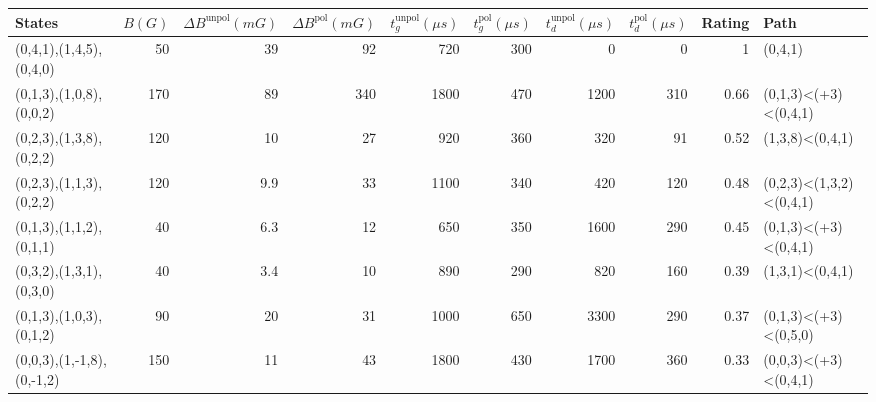 \begin{tabular}{lrrrrrrrrl}
\hline
 {States}                  &   {$B(G)$} &   {$\Delta B^{\text{unpol}}(mG)$} &   {$\Delta B^{\text{pol}}(mG)$} &   {$t^{\text{unpol}}_{g}(\mu s)$} &   {$t^{\text{pol}}_{g}(\mu s)$} &   {$t^{\text{unpol}}_{d}(\mu s)$} &   {$t^{\text{pol}}_{d}(\mu s)$} &   {Rating} & {Path}                  \\
\hline
 (0,4,1),(1,4,5),(0,4,0)   &         50 &                              39   &                              92 &                               720 &                             300 &                                 0 &                               0 &       1    & (0,4,1)                 \\
 (0,1,3),(1,0,8),(0,0,2)   &        170 &                              89   &                             340 &                              1800 &                             470 &                              1200 &                             310 &       0.66 & (0,1,3)<(+3)<(0,4,1)    \\
 (0,2,3),(1,3,8),(0,2,2)   &        120 &                              10   &                              27 &                               920 &                             360 &                               320 &                              91 &       0.52 & (1,3,8)<(0,4,1)         \\
 (0,2,3),(1,1,3),(0,2,2)   &        120 &                               9.9 &                              33 &                              1100 &                             340 &                               420 &                             120 &       0.48 & (0,2,3)<(1,3,2)<(0,4,1) \\
 (0,1,3),(1,1,2),(0,1,1)   &         40 &                               6.3 &                              12 &                               650 &                             350 &                              1600 &                             290 &       0.45 & (0,1,3)<(+3)<(0,4,1)    \\
 (0,3,2),(1,3,1),(0,3,0)   &         40 &                               3.4 &                              10 &                               890 &                             290 &                               820 &                             160 &       0.39 & (1,3,1)<(0,4,1)         \\
 (0,1,3),(1,0,3),(0,1,2)   &         90 &                              20   &                              31 &                              1000 &                             650 &                              3300 &                             290 &       0.37 & (0,1,3)<(+3)<(0,5,0)    \\
 (0,0,3),(1,-1,8),(0,-1,2) &        150 &                              11   &                              43 &                              1800 &                             430 &                              1700 &                             360 &       0.33 & (0,0,3)<(+3)<(0,4,1)    \\
\hline
\end{tabular}